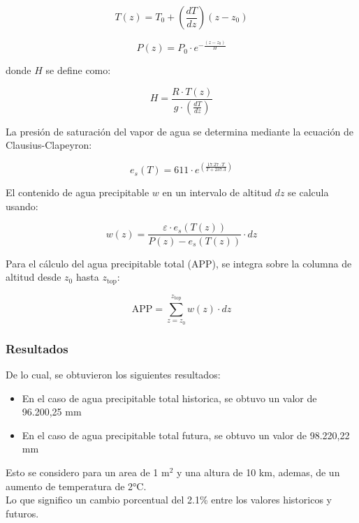 \documentclass{article}  %
\begin{document}
\begin{equation}
T(z) = T_0 + \left( \frac{dT}{dz} \right) (z - z_0)
\end{equation}

\begin{equation}
P(z) = P_0 \cdot e^{-\frac{(z - z_0)}{H}}
\end{equation}

donde $H$ se define como:

\begin{equation}
H = \frac{R \cdot T(z)}{g \cdot \left( \frac{dT}{dz} \right)}
\end{equation}

La presión de saturación del vapor de agua se determina mediante la ecuación de Clausius-Clapeyron:

\begin{equation}
e_s(T) = 611 \cdot e^{\left(\frac{17.27 \cdot T}{T + 237.3}\right)}
\end{equation}

El contenido de agua precipitable $w$ en un intervalo de altitud $dz$ se calcula usando:

\begin{equation}
w(z) = \frac{\varepsilon \cdot e_s(T(z))}{P(z) - e_s(T(z))} \cdot dz
\end{equation}

Para el cálculo del agua precipitable total (APP), se integra sobre la columna de altitud desde $z_0$ hasta $z_{\text{top}}$:

\begin{equation}
\text{APP} = \sum_{z=z_0}^{z_{\text{top}}} w(z) \cdot dz
\end{equation}

\subsubsection{Resultados}
De lo cual, se obtuvieron los siguientes resultados:

\begin{itemize}
    \item En el caso de agua precipitable total historica, se obtuvo un valor de 96.200,25 mm 
    \item En el caso de agua precipitable total futura, se obtuvo un valor de 98.220,22 mm
\end{itemize}
Esto se considero para un area de 1 m$^2$ y una altura de 10 km, ademas, de un aumento de temperatura de 2°C. \\
Lo que significo un cambio porcentual del 2.1\% entre los valores historicos y futuros.
\end{document}
